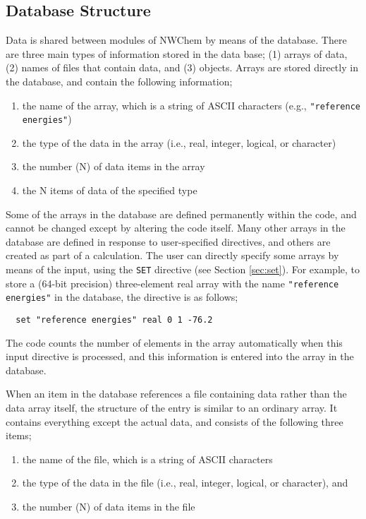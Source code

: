 \subsection{Database Structure}
\label{database}

Data is shared between modules of NWChem by means of the database.  There
are three main types of information stored in the data base; (1) arrays of
data, (2) names of files that contain data, and (3) objects.  
Arrays are stored directly in the database, and contain the following
information;

\begin{enumerate}
\item the name of the array, which is a string of ASCII characters (e.g., 
      \verb+"reference energies"+)
\item the type of the data in the array (i.e., real, integer, logical, or character) 
\item the number (N) of data items in the array
\item the N items of data of the specified type
\end{enumerate}

Some of the arrays in the database are defined permanently within the code, and
cannot be changed except by altering the code itself.  Many other arrays in the
database are defined in response to user-specified directives, and
others are created as part
of a calculation.  The user can directly specify some arrays by means of
the input, using the \verb+SET+ directive (see Section \ref{sec:set}).  
For example, to store a (64-bit precision) three-element real array 
with the name \verb+"reference energies"+ in the database, the directive is 
as follows;

\begin{verbatim}
  set "reference energies" real 0 1 -76.2
\end{verbatim}

The code counts the number of elements in the array automatically when this input
directive is processed, and this information is entered 
into the array in the database.

When an item in the database references a file containing data rather
than the data array itself, the structure of the entry is 
similar to an ordinary array.  It contains everything except 
the actual data, and consists of the following
three items;

\begin{enumerate}
\item the name of the file, which is a string of ASCII characters
\item the type of the data in the file (i.e., real, integer, logical, 
or character), and 
\item the number (N) of data items in the file
\end{enumerate}

